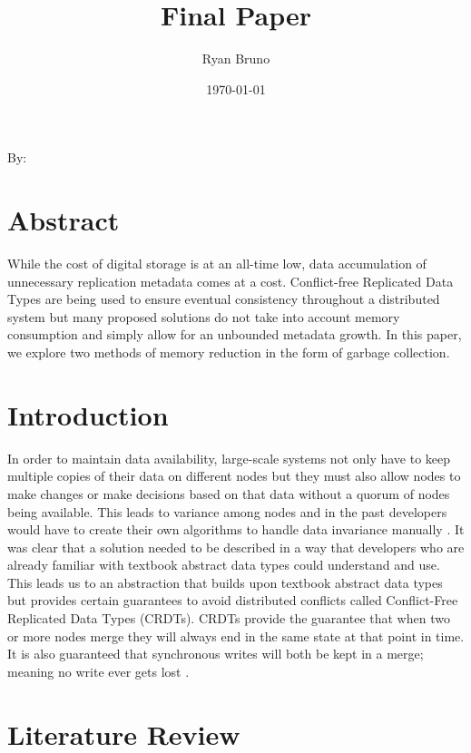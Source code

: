 \documentclass{article}
\title{Final Paper}
\author{Ryan Bruno}
\date{\today}
\renewcommand{\maketitle}{
    \begin{center}
        \Huge\textbf{\thetitle}
    \end{center}
    \begin{multicols}{2}
        \begin{flushright}
        By: \theauthor
        \end{flushright}

        \columnbreak
        
        \thedate
    \end{multicols}
}
\begin{document}
\maketitle

\begin{multicols}{2}
\begin{refsection}

\section*{Abstract}

While the cost of digital storage is at an all-time low, data
accumulation of unnecessary replication metadata comes at a cost.
Conflict-free Replicated Data Types are being used to ensure
eventual consistency throughout a distributed system but many proposed
solutions do not take into account memory consumption and simply allow for
an unbounded metadata growth. In this paper, we explore two methods of
memory reduction in the form of garbage collection.

\section*{Introduction}

In order to maintain data availability, large-scale systems not only
have to keep multiple copies of their data on different nodes but they
must also allow nodes to make changes or make decisions based on that
data without a quorum of nodes being available. This leads to variance
among nodes and in the past developers would have to create their own
algorithms to handle data invariance manually \cite{kleppmann_conflict-free_2017}.
It was clear that a solution needed to be described in a way that
developers who are already familiar with textbook abstract data types
could understand and use. This leads us to an abstraction that builds
upon textbook abstract data types but provides certain guarantees to avoid
distributed conflicts called Conflict-Free Replicated Data Types (CRDTs).
CRDTs provide the guarantee that when two or more nodes merge they will
always end in the same state at that point in time. It is also guaranteed
that synchronous writes will both be kept in a merge; meaning no write
ever gets lost \cite{shapiro_comprehensive_2011}.

\section*{Literature Review}


\end{refsection}
\end{multicols}
\end{document}
